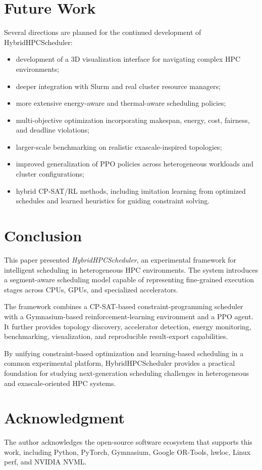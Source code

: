 \documentclass[conference]{IEEEtran}
\begin{document}
\section{Future Work}
Several directions are planned for the continued development of
HybridHPCScheduler:
\begin{itemize}
    \item development of a 3D visualization interface for navigating complex
    HPC environments;
    \item deeper integration with Slurm and real cluster resource managers;
    \item more extensive energy-aware and thermal-aware scheduling policies;
    \item multi-objective optimization incorporating makespan, energy, cost,
    fairness, and deadline violations;
    \item larger-scale benchmarking on realistic exascale-inspired topologies;
    \item improved generalization of PPO policies across heterogeneous workloads
    and cluster configurations;
    \item hybrid CP-SAT/RL methods, including imitation learning from optimized
    schedules and learned heuristics for guiding constraint solving.
\end{itemize}

\section{Conclusion}
This paper presented \textit{HybridHPCScheduler}, an experimental framework for
intelligent scheduling in heterogeneous HPC environments. The system introduces
a segment-aware scheduling model capable of representing fine-grained execution
stages across CPUs, GPUs, and specialized accelerators.

The framework combines a CP-SAT-based constraint-programming scheduler with a
Gymnasium-based reinforcement-learning environment and a PPO agent. It further
provides topology discovery, accelerator detection, energy monitoring,
benchmarking, visualization, and reproducible result-export capabilities.

By unifying constraint-based optimization and learning-based scheduling in a
common experimental platform, HybridHPCScheduler provides a practical foundation
for studying next-generation scheduling challenges in heterogeneous and
exascale-oriented HPC systems.

\section*{Acknowledgment}
The author acknowledges the open-source software ecosystem that supports this
work, including Python, PyTorch, Gymnasium, Google OR-Tools, hwloc, Linux
perf, and NVIDIA NVML.
\end{document}
